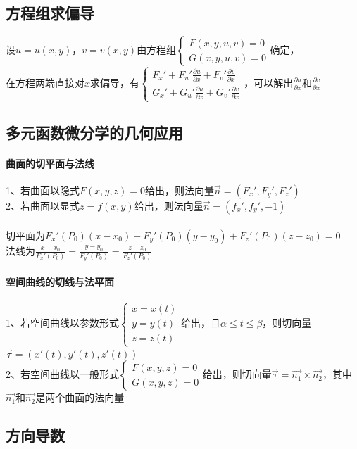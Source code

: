 \documentclass{article}
\begin{document}
\begin{flushleft}
	\subsection{方程组求偏导}
	
	设$u=u(x,y)$，$v=v(x,y)$由方程组$\left\{
	\begin{array}{lcl}
	F(x,y,u,v)=0\\
	G(x,y,u,v)=0
	\end{array} \right.$确定，\\
	在方程两端直接对$x$求偏导，有$\left\{
	\begin{array}{lcl}
	F_x'+F_u'\frac{\partial u}{\partial x}+F_v'\frac{\partial v}{\partial x}\\
	G_x'+G_u'\frac{\partial u}{\partial x}+G_v'\frac{\partial v}{\partial x}
	\end{array} \right.$，可以解出$\frac{\partial u}{\partial x}$和$\frac{\partial v}{\partial x}$\\
	
	\subsection{多元函数微分学的几何应用}
	
	\paragraph{曲面的切平面与法线}
	1、若曲面以隐式$F(x,y,z)=0$给出，则法向量$\vec{n}=(F_x',F_y',F_z')$\\
	2、若曲面以显式$z=f(x,y)$给出，则法向量$\vec{n}=(f_x',f_y',-1)$\\
	~\\
	切平面为$F_x'(P_0)(x-x_0)+F_y'(P_0)(y-y_0)+F_z'(P_0)(z-z_0)=0$\\
	法线为$\frac{x-x_0}{F_x'(P_0)}=\frac{y-y_0}{F_y'(P_0)}=\frac{z-z_0}{F_z'(P_0)}$\\
	
	\paragraph{空间曲线的切线与法平面}
	1、若空间曲线以参数形式$\left\{
	\begin{array}{lcl}
	x=x(t)\\
	y=y(t)\\
	z=z(t)
	\end{array} \right.$给出，且$\alpha\le t\le\beta$，则切向量$\vec{\tau}=(x'(t),y'(t),z'(t))$\\
	2、若空间曲线以一般形式$\left\{
	\begin{array}{lcl}
	F(x,y,z)=0\\
	G(x,y,z)=0
	\end{array} \right.$给出，则切向量$\vec{\tau}=\vec{n_1}\times\vec{n_2}$，其中$\vec{n_1}$和$\vec{n_2}$是两个曲面的法向量\\
	
	\subsection{方向导数}
	
	
	
	
\end{flushleft}
\end{document}

